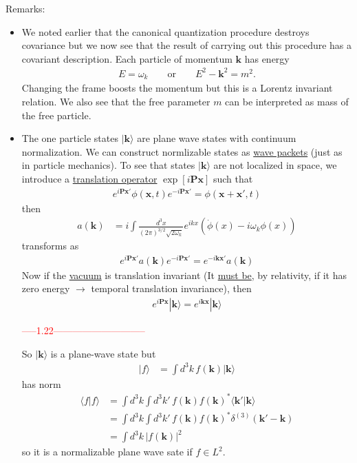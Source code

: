 \documentclass{article}
\begin{document}
Remarks:
\begin{itemize}
\item We noted earlier that the canonical quantization procedure destroys covariance but we now see that the result of carrying out this procedure has a covariant description. Each particle of momentum $\mathbf{k}$ has energy
\begin{align}
E=\omega_k\qquad\text{or}\qquad E^2-\mathbf{k}^2=m^2.
\end{align}
Changing the frame boosts the momentum but this is a Lorentz invariant relation. We also see that the free parameter $m$ can be interpreted as mass of the free particle.

\item The one particle states $|\mathbf{k}\rangle$ are plane wave states with continuum normalization. We can construct normlizable states as \underline{wave packets} (just as in particle mechanics). To see that states $|\mathbf{k}\rangle$ are not localized in space, we introduce a \underline{translation operator} $\exp[i\mathbf{Px}]$ such that
\begin{align}
e^{i\mathbf{Px}'}\phi(\mathbf{x},t)e^{-i\mathbf{Px}'}=\phi(\mathbf{x}+\mathbf{x}',t)
\end{align}
then
\begin{align}
a(\mathbf{k})
&=i\int\frac{d^3x}{(2\pi)^{3/2}\sqrt{2\omega_k}}e^{ikx}(\dot{\phi}(x)-i\omega_k\phi(x))
\end{align}
transforms as
\begin{align}
e^{i\mathbf{Px}'}a(\mathbf{k})e^{-i\mathbf{Px}'}=e^{-i\mathbf{kx}'}a(\mathbf{k})
\end{align}
Now if the \underline{vacuum} is translation invariant (It \underline{must be}, by relativity, if it has zero energy $\rightarrow$ temporal translation invariance), then
\begin{align}
e^{i\mathbf{Px}}|\mathbf{k}\rangle=e^{i\mathbf{kx}}|\mathbf{k}\rangle
\end{align}

\textcolor{red}{-----1.22-----------------------------}
\newline

So $|\mathbf{k}\rangle$ is a plane-wave state but
\begin{align}
|f\rangle&=\int d^3k\,f(\mathbf{k})|\mathbf{k}\rangle
\end{align}
has norm
\begin{align}
\langle f|f\rangle
&=\int d^3k\int d^3k'\,f(\mathbf{k})f(\mathbf{k})^*\langle\mathbf{k}'|\mathbf{k}\rangle\\
&=\int d^3k\int d^3k'\,f(\mathbf{k})f(\mathbf{k})^*\delta^{(3)}(\mathbf{k}'-\mathbf{k})\\
&=\int d^3k\,|f(\mathbf{k})|^2
\end{align}
so it is a normalizable plane wave sate if $f\in L^2$. 


\end{itemize}
\end{document}
